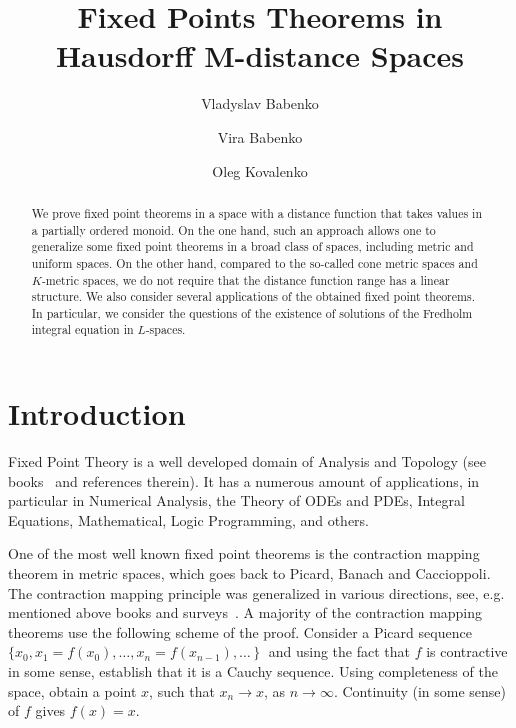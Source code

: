 \documentclass[12pt]{amsart}          %
\begin{document}
	
\title{Fixed Points Theorems in Hausdorff M-distance Spaces}

\author{Vladyslav Babenko}
\author{Vira Babenko}
\author{Oleg Kovalenko}
	
\begin{abstract}
We prove fixed point theorems in a space with a distance function that takes values in a partially ordered monoid. On the one hand, such an approach allows one to generalize some fixed point theorems in a broad class of spaces, including metric and uniform spaces. On the other hand, compared to the so-called cone metric spaces and $K$-metric spaces, we do not require that the distance function range has a linear structure. We also consider several applications of the obtained fixed point theorems. In particular, we consider the questions of the existence of solutions of the Fredholm integral equation in $L$-spaces.
\end{abstract}


\maketitle
	
\section{Introduction}
Fixed Point Theory is a well developed domain of Analysis and Topology (see books~\cite{Granas,Kirk,carl2014fixed} and references therein). It has a numerous amount of applications, in particular in  Numerical Analysis, the Theory of ODEs and PDEs, Integral Equations, Mathematical, Logic Programming, and others. 

One of the most well known fixed point theorems is the contraction mapping theorem in metric spaces, which goes back to Picard, Banach and Caccioppoli. The contraction mapping principle was generalized in various directions, see, e.g. mentioned above books and surveys~\cite{Zabrejko, Jancovic}.
 A majority of the contraction mapping theorems use the following scheme of the proof. Consider  a Picard sequence 
$%
\{x_0,x_1=f(x_0),\ldots,x_n=f(x_{n-1}),\ldots\,\}\;
$%
 and using the fact that  $f$ is contractive in some sense, establish that it is a Cauchy sequence. Using completeness of the space, obtain a point $x$, such that $x_n\to x$, as $n\to\infty.$ Continuity (in some sense) of $f$ gives $f(x)=x$. 
\end{document}
